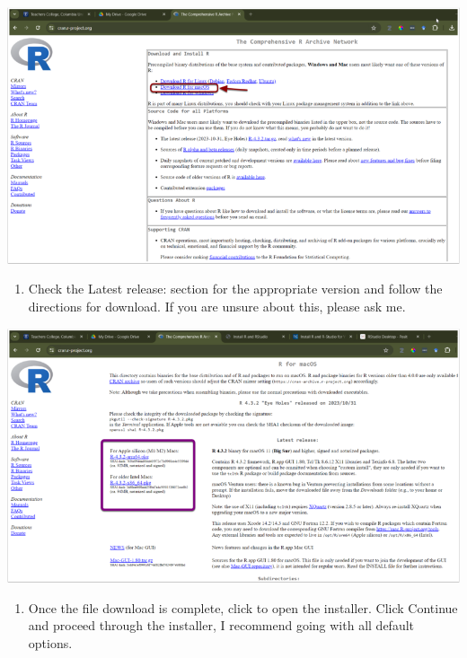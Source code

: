 \documentclass[
]{book}
\providecommand{\tightlist}{%
  \setlength{\itemsep}{0pt}\setlength{\parskip}{0pt}}
\begin{document}
\includegraphics{img/01-rstudiodownload-mac.png}

\begin{enumerate}
\def\labelenumi{\arabic{enumi}.}
\tightlist
\item
  Check the Latest release: section for the appropriate version and follow the directions for download. If you are unsure about this, please ask me.
\end{enumerate}

\includegraphics{img/01-rversion-mac.png}

\begin{enumerate}
\def\labelenumi{\arabic{enumi}.}
\tightlist
\item
  Once the file download is complete, click to open the installer. Click Continue and proceed through the installer, I recommend going with all default options.
\end{enumerate}
\end{document}
